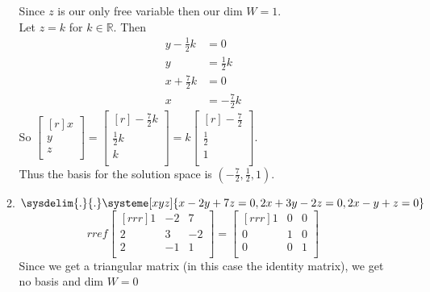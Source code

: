 \documentclass[12pt]{article}
\begin{document}
\begin{enumerate}
\begin{enumerate}
		Since $z$ is our only free variable then our dim $W=1$.\\
		Let $z=k$ for $k\in\mathbb{R}$. Then
		\begin{align*}
		y-\frac{1}{2}k&=0\\
		y&=\frac{1}{2}k\\
		x+\frac{7}{2}k&=0\\
		x&=-\frac{7}{2}k		
		\end{align*} 
		So $\begin{bmatrix}[r]x\\y\\z\\\end{bmatrix}=\begin{bmatrix}[r]-\frac{7}{2}k\\\frac{1}{2}k\\k\\\end{bmatrix}=k\begin{bmatrix}[r]-\frac{7}{2}\\\frac{1}{2}\\1\\\end{bmatrix}$.\\
		Thus the basis for the solution space is $(-\frac{7}{2},\frac{1}{2},1)$.
	\item $\sysdelim{.}{.}\systeme[xyz]{x-2y+7z=0,2x+3y-2z=0,2x-y+z=0}$\\
		\[ rref\begin{bmatrix}[rrr]1&-2&7\\2&3&-2\\2&-1&1\\\end{bmatrix}=\begin{bmatrix}[rrr]1&0&0\\0&1&0\\0&0&1\\\end{bmatrix} \]
		Since we get a triangular matrix (in this case the identity matrix), we get no basis and dim $W=0$
	\end{enumerate}
	

\end{enumerate}
\end{document}
